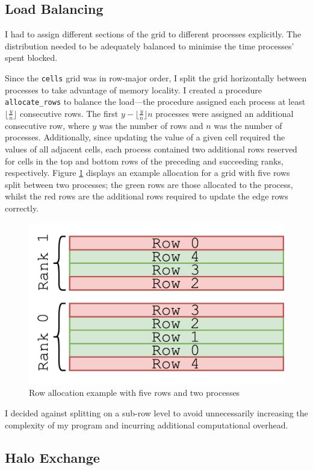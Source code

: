 \documentclass[twocolumn, a4paper]{article}
\begin{document}
\subsection{Load Balancing}

I had to assign different sections of the grid to different processes explicitly.
The distribution needed to be adequately balanced to minimise the time processes' spent blocked.

Since the \texttt{cells} grid was in row-major order, I split the grid horizontally between processes to take advantage of memory locality.
I created a procedure \texttt{allocate\_rows} to balance the load---the procedure assigned each process at least $\lfloor\frac{y}{n}\rfloor$ consecutive rows.
The first $y - \lfloor\frac{y}{n}\rfloor n$ processes were assigned an additional consecutive row, where $y$ was the number of rows and $n$ was the number of processes.
Additionally, since updating the value of a given cell required the values of all adjacent cells, each process contained two additional rows reserved for cells in the top and bottom rows of the preceding and succeeding ranks, respectively.
Figure \ref{fig:rows} displays an example allocation for a grid with five rows split between two processes; the green rows are those allocated to the process, whilst the red rows are the additional rows required to update the edge rows correctly.

\begin{figure}[htbp]
  \centering
  \includegraphics[width=.6\linewidth]{rows.png}
  \caption{Row allocation example with five rows and two processes}\label{fig:rows}
\end{figure}

I decided against splitting on a sub-row level to avoid unnecessarily increasing the complexity of my program and incurring additional computational overhead.

\subsection{Halo Exchange}
\end{document}
